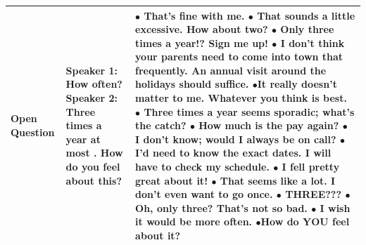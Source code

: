 \documentclass[11pt]{article}
\begin{document}
\begin{longtable}{|p{2cm}|p{3cm}|p{10cm}|}
 Open Question & \textbf{Speaker 1:} How often? \newline \hspace*{0.5cm} \textbf{Speaker 2:} Three times a year at most . How do you feel about this? & $\bullet$ That's fine with me. \newline $\bullet$ That sounds a little excessive. How about two? \newline $\bullet$ Only three times a year!? Sign me up! \newline $\bullet$ I don't think your parents need to come into town that frequently. An annual visit around the holidays should suffice. \newline $\bullet$It really doesn't matter to me. Whatever you think is best. \newline \newline $\bullet$ Three times a year seems sporadic; what's the catch? \newline $\bullet$ How much is the pay again? \newline $\bullet$ I don't know; would I always be on call? \newline $\bullet$ I'd need to know the exact dates. I will have to check my schedule. \newline $\bullet$ I fell pretty great about it!	\newline \newline $\bullet$ That seems like a lot. I don't even want to go once. \newline $\bullet$ THREE??? \newline $\bullet$ Oh, only three? That's not so bad. \newline $\bullet$ I wish it would be more often. \newline $\bullet$How do YOU feel about it? \\\hline

\end{longtable}
\end{document}
